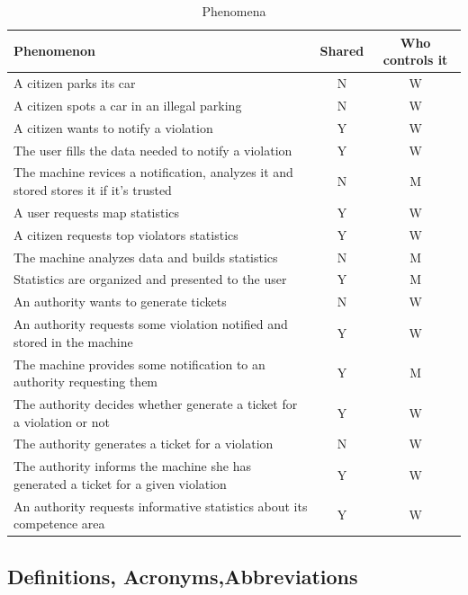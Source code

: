 \documentclass{article}
\begin{document}
	\begin{table}[H]
	\begin{center}
		\caption{Phenomena}
		\small
		\begin{tabular}{|l|c|c|}
			\hline
			\textbf{Phenomenon}		&	\textbf{Shared}&\textbf{Who controls it}\\
			\hline
			A citizen parks its car	&	N	&	W\\
			A citizen spots a car in 
			an illegal parking		&	N	&	W\\
			A citizen wants to
			notify a violation		&	Y	&	W\\
			The user fills the data
			needed to notify 
			a violation				&	Y	&	W\\
			The machine revices a
			notification, analyzes
			it and stored stores it 
			if it's trusted			&	N	&	M\\
			A user requests
			map statistics			&	Y	&	W\\
			A citizen requests
			top violators statistics	&	Y	&	W\\
			The machine analyzes
			data and builds 
			statistics				&	N	&	M\\
			Statistics are organized
			and presented
			to the user				&	Y	&	M\\
			An authority wants to
			generate tickets			&	N	&	W\\
			An authority requests
			some violation notified
			and stored in the
			machine					&	Y	&	W\\
			The machine provides
			some notification to
			an authority requesting
			them						&	Y	&	M\\
			The authority decides
			whether generate a ticket
			for a violation or not	&	Y	&	W\\
			The authority generates
			a ticket for a
			violation				&	N	&	W\\
			The authority informs
			the machine she has 
			generated a ticket 
			for a given violation	&	Y	&	W\\
			An authority requests
			informative statistics
			about its competence 
			area						&	Y	&	W\\
			\hline
		\end{tabular}				
	\end{center}
	\end{table}
		
	\subsection{Definitions, Acronyms,Abbreviations} \label{definitions}
\end{document}
